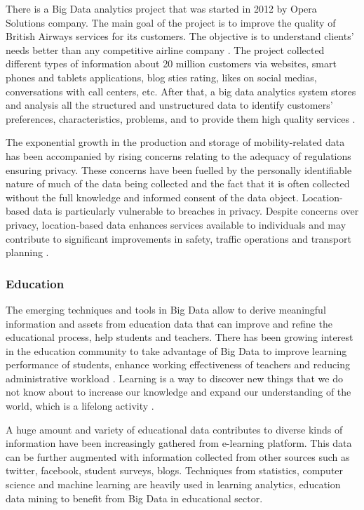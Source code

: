 \documentclass[runningheads]{llncs}
\begin{document}
There is a Big Data analytics project that was started in 2012 by Opera Solutions company. The main goal of the project is to improve the quality of British Airways services for its customers. The objective is to understand clients' needs better than any competitive airline company \cite{TRANSPORTREPORT}. The project collected different types of information about 20 million customers via websites, smart phones and tablets applications, blog sties rating, likes on social medias, conversations with call centers, etc. After that, a big data analytics system stores and
analysis all the structured and unstructured data to identify customers' preferences, characteristics, problems, and to provide them high quality services \cite{TRANSPORT}. 

The exponential growth in the production and storage of mobility-related data has been accompanied by
rising concerns relating to the adequacy of regulations ensuring privacy. These concerns have been fuelled
by the personally identifiable nature of much of the data being collected and the fact that it is often collected without the full knowledge and informed consent of the data object. Location-based data is particularly vulnerable to breaches in privacy. Despite concerns over privacy, location-based data enhances services available to individuals and may contribute to significant improvements in safety, traffic operations and transport planning \cite{TRANSPORT}. 

\subsubsection{Education}

The emerging techniques and tools in Big Data allow to derive meaningful information and assets from education data that can improve and refine the educational process, help students and teachers. There has been growing interest in the education community to take advantage of Big Data to improve learning performance of
students, enhance working effectiveness of teachers and reducing administrative workload \cite{SHAMRZO}. Learning is a way to discover new things that we do not know about to increase our knowledge and expand our understanding of the world, which is a lifelong activity \cite{BIGEDUCATION}. 

A huge amount and variety of educational data contributes to diverse kinds of information have been increasingly 
gathered from e-learning platform. This data can be further augmented with information collected from other sources such as twitter, facebook, student surveys, blogs. Techniques from statistics, computer science and machine learning are heavily used in learning analytics, education data mining to benefit from Big Data in educational sector.
\end{document}
